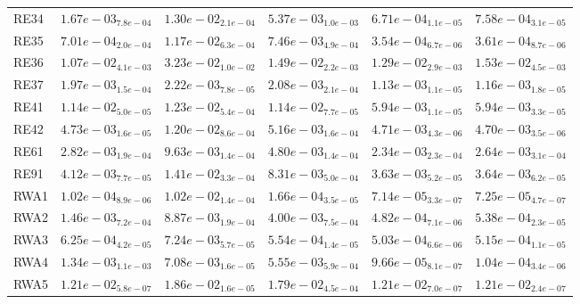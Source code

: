 \documentclass{article}
\begin{document}
\begin{table}
\begin{scriptsize}
\begin{tabular}{llllll}
RE34 & $  1.67e-03_{ 7.8e-04}$ & $  1.30e-02_{ 2.1e-04}$ & $  5.37e-03_{ 1.0e-03}$ & \cellcolor{gray95}$  6.71e-04_{ 1.1e-05}$ & \cellcolor{gray25}$  7.58e-04_{ 3.1e-05}$ \\
RE35 & $  7.01e-04_{ 2.0e-04}$ & $  1.17e-02_{ 6.3e-04}$ & $  7.46e-03_{ 4.9e-04}$ & \cellcolor{gray95}$  3.54e-04_{ 6.7e-06}$ & \cellcolor{gray25}$  3.61e-04_{ 8.7e-06}$ \\
RE36 & \cellcolor{gray95}$  1.07e-02_{ 4.1e-03}$ & $  3.23e-02_{ 1.0e-02}$ & $  1.49e-02_{ 2.2e-03}$ & \cellcolor{gray25}$  1.29e-02_{ 2.9e-03}$ & $  1.53e-02_{ 4.5e-03}$ \\
RE37 & $  1.97e-03_{ 1.5e-04}$ & $  2.22e-03_{ 7.8e-05}$ & $  2.08e-03_{ 2.1e-04}$ & \cellcolor{gray95}$  1.13e-03_{ 1.1e-05}$ & \cellcolor{gray25}$  1.16e-03_{ 1.8e-05}$ \\
RE41 & $  1.14e-02_{ 5.0e-05}$ & $  1.23e-02_{ 5.4e-04}$ & $  1.14e-02_{ 7.7e-05}$ & \cellcolor{gray95}$  5.94e-03_{ 1.1e-05}$ & \cellcolor{gray25}$  5.94e-03_{ 3.3e-05}$ \\
RE42 & $  4.73e-03_{ 1.6e-05}$ & $  1.20e-02_{ 8.6e-04}$ & $  5.16e-03_{ 1.6e-04}$ & \cellcolor{gray25}$  4.71e-03_{ 4.3e-06}$ & \cellcolor{gray95}$  4.70e-03_{ 3.5e-06}$ \\
RE61 & $  2.82e-03_{ 1.9e-04}$ & $  9.63e-03_{ 1.4e-04}$ & $  4.80e-03_{ 1.4e-04}$ & \cellcolor{gray95}$  2.34e-03_{ 2.3e-04}$ & \cellcolor{gray25}$  2.64e-03_{ 3.1e-04}$ \\
RE91 & $  4.12e-03_{ 7.7e-05}$ & $  1.41e-02_{ 3.3e-04}$ & $  8.31e-03_{ 5.0e-04}$ & \cellcolor{gray95}$  3.63e-03_{ 5.2e-05}$ & \cellcolor{gray25}$  3.64e-03_{ 6.2e-05}$ \\
RWA1 & $  1.02e-04_{ 8.9e-06}$ & $  1.02e-02_{ 1.4e-04}$ & $  1.66e-04_{ 3.5e-05}$ & \cellcolor{gray95}$  7.14e-05_{ 3.3e-07}$ & \cellcolor{gray25}$  7.25e-05_{ 4.7e-07}$ \\
RWA2 & $  1.46e-03_{ 7.2e-04}$ & $  8.87e-03_{ 1.9e-04}$ & $  4.00e-03_{ 7.5e-04}$ & \cellcolor{gray95}$  4.82e-04_{ 7.1e-06}$ & \cellcolor{gray25}$  5.38e-04_{ 2.3e-05}$ \\
RWA3 & $  6.25e-04_{ 4.2e-05}$ & $  7.24e-03_{ 5.7e-05}$ & $  5.54e-04_{ 1.4e-05}$ & \cellcolor{gray95}$  5.03e-04_{ 6.6e-06}$ & \cellcolor{gray25}$  5.15e-04_{ 1.1e-05}$ \\
RWA4 & $  1.34e-03_{ 1.1e-03}$ & $  7.08e-03_{ 1.6e-05}$ & $  5.55e-03_{ 5.9e-04}$ & \cellcolor{gray95}$  9.66e-05_{ 8.1e-07}$ & \cellcolor{gray25}$  1.04e-04_{ 3.4e-06}$ \\
RWA5 & \cellcolor{gray25}$  1.21e-02_{ 5.8e-07}$ & $  1.86e-02_{ 1.6e-05}$ & $  1.79e-02_{ 4.5e-04}$ & $  1.21e-02_{ 7.0e-07}$ & \cellcolor{gray95}$  1.21e-02_{ 2.4e-07}$ \\

\end{tabular}
\end{scriptsize}
\end{table}
\end{document}
